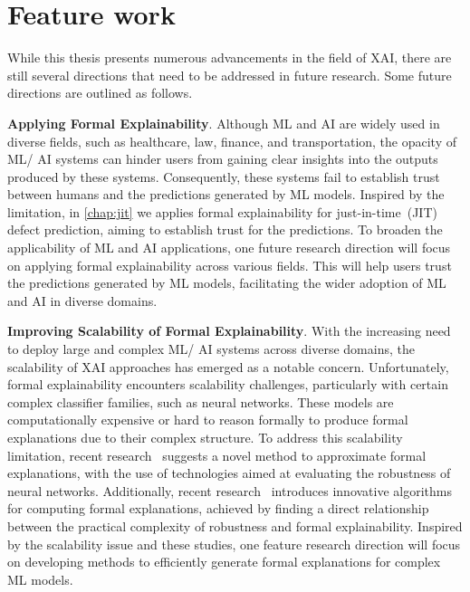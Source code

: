 \section*{Feature work}
While this thesis presents numerous advancements in the field of XAI, 
there are still several directions that need to be addressed in future research.
%
Some future directions are outlined as follows.

\textbf{Applying Formal Explainability}.
%
Although ML and AI are widely used in diverse fields, such as healthcare, law, finance, and transportation, 
the opacity of ML/ AI systems can hinder users from gaining clear insights into 
the outputs produced by these systems.
%
Consequently, these systems fail to establish trust between humans and the
predictions generated by ML models.
%
Inspired by the limitation, in \autoref{chap:jit} we applies formal explainability for
just-in-time~(JIT) defect prediction, aiming to establish trust for the predictions.
%
To broaden the applicability of ML and AI applications, one future research direction 
will focus on applying formal explainability across various fields.
%
This will help users trust the predictions generated by ML models, facilitating the wider 
adoption of ML and AI in diverse domains.

\textbf{Improving Scalability of Formal Explainability}.
%
With the increasing need to deploy large and complex ML/ AI systems across diverse domains, 
the scalability of XAI approaches has emerged as a notable concern.
%
Unfortunately, formal explainability encounters scalability challenges, 
particularly with certain complex classifier families, such as neural networks.
%
These models are computationally expensive or hard to reason formally
to produce formal explanations due to their complex structure.
%
To address this scalability limitation, recent research~\cite{bk-tacas23} 
suggests a novel method to approximate formal explanations, with the use of 
technologies aimed at evaluating the robustness of neural networks.
%
Additionally, recent research~\cite{bk-tacas23} introduces innovative algorithms for computing
formal explanations, achieved by finding a direct relationship between 
the practical complexity of robustness and formal explainability.
%
Inspired by the scalability issue and these studies, one feature research direction
will focus on developing methods to efficiently
generate formal explanations for complex ML models.
